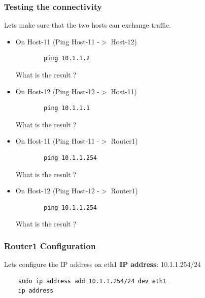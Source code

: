 \subsubsection{Testing the connectivity}
Lets make sure that the two hosts can exchange traffic.
\newline
\begin{itemize}
	\item On Host-11 (Ping Host-11 -$>$ Host-12)
	\begin{verbatim}
	    ping 10.1.1.2
	\end{verbatim}

	What is the result ?
	\item On Host-12 (Ping Host-12 -$>$ Host-11)
	\begin{verbatim}
	    ping 10.1.1.1
	\end{verbatim}

	What is the result ?
	\item On Host-11 (Ping Host-11 -$>$ Router1)
	\begin{verbatim}
	    ping 10.1.1.254
	\end{verbatim}

	What is the result ?
	\item On Host-12 (Ping Host-12 -$>$ Router1)
	\begin{verbatim}
	    ping 10.1.1.254
	\end{verbatim}

	What is the result ?
\end{itemize}


\subsubsection{Router1 Configuration}
Lets configure the IP address on eth1
\textbf{IP address}: 10.1.1.254/24

\begin{verbatim}
    sudo ip address add 10.1.1.254/24 dev eth1
    ip address
\end{verbatim}

